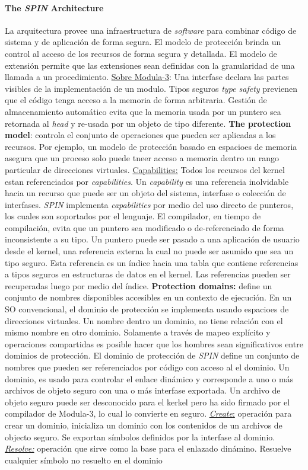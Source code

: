 \paragraph{\textnormal{\textbf{The \textit{SPIN} Architecture}}}
La arquitectura provee una infraestructura de \textit{software} para combinar código de sistema y de aplicación de forma segura. El modelo de protección brinda un control al acceso de los recursos de forma segura y detallada. El modelo de extensión permite que las extensiones sean definidas con la granularidad de una llamada a un procedimiento. \underline{Sobre Modula-3}: Una interfase declara las partes visibles de la implementación de un modulo. Tipos seguros \textit{type safety} previenen que el código tenga acceso a la memoria de forma arbitraria. Gestión de almacenamiento automático evita que la memoria usada por un puntero sea retornada al \textit{head} y re-usada por un objeto de tipo diferente.  \textbf{The protection model}: controla el conjunto de operaciones que pueden ser aplicadas a los recursos. Por ejemplo, un modelo de protección basado en espacioes de memoria asegura que un proceso solo puede tneer acceso a memoria dentro un rango particular de direcciones virtuales. \underline{Capabilities:} Todos los recursos del kernel estan referenciados por \textit{capabilities}. Un \textit{capability} es una referencia inolvidable hacia un recurso que puede ser un objeto del sistema, interfase o colección de interfases. \textit{SPIN} implementa \textit{capabilities} por medio del uso directo de punteros, los cuales son soportados por el lenguaje. El compilador, en tiempo de compilación, evita que un puntero sea modificado o de-referenciado de forma inconsistente a su tipo. Un puntero puede ser pasado a una aplicación de usuario desde el kernel, una referencia externa la cual no puede ser asumido que sea un tipo seguro. Esta referencia es un índice hacia una tabla que contiene referencias a tipos seguros en estructuras de datos en el kernel. Las referencias pueden ser recuperadas luego por medio del índice. \textbf{Protection domains:} define un conjunto de nombres disponibles accesibles en un contexto de ejecución. En un SO convencional, el dominio de protección se implementa usando espacioes de direcciones virtuales. Un nombre dentro un dominio, no tiene relación con el mismo nombre en otro dominio. Solamente a través de mapeo explícito y operaciones compartidas es posible hacer que los hombres sean significativos entre dominios de protección. El dominio de protección de \textit{SPIN} define un conjunto de nombres que pueden ser referenciados por código con acceso al el dominio. Un dominio, es usado para controlar el enlace dinámico y corresponde a uno o más archivos de objeto seguro con una o más interfase exportada. Un archivo de objeto seguro puede ser desconocido para el kerkel pero ha sido firmado por el compilador de Modula-3, lo cual lo convierte en seguro. \underline{\textit{Create}:} operación para crear un dominio, inicializa un dominio con los contenidos de un archivos de objecto seguro. Se exportan símbolos definidos por la interfase al dominio. \underline{\textit{Resolve:}} operación que sirve como la base para el enlazado dinámino. Resuelve cualquier símbolo no resuelto en el dominio 